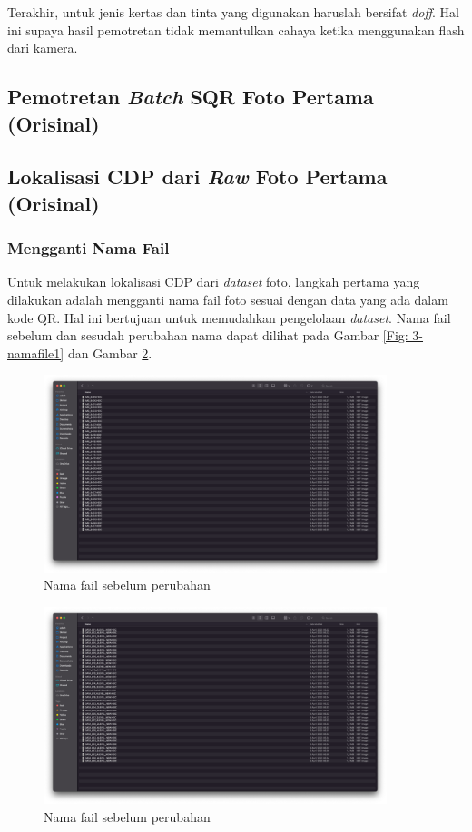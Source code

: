 \noindent Terakhir, untuk jenis kertas dan tinta yang digunakan haruslah bersifat \emph{doff}. Hal ini supaya hasil pemotretan tidak memantulkan cahaya ketika
menggunakan flash dari kamera.

\subsection{Pemotretan \emph{Batch} SQR Foto Pertama (Orisinal)}

\subsection{Lokalisasi CDP dari \emph{Raw} Foto Pertama (Orisinal)}
\subsubsection{Mengganti Nama Fail}
Untuk melakukan lokalisasi CDP dari \emph{dataset} foto, langkah pertama yang dilakukan adalah mengganti nama fail foto sesuai dengan data yang ada dalam kode
QR. Hal ini bertujuan untuk memudahkan pengelolaan \emph{dataset}. Nama fail sebelum dan sesudah perubahan nama dapat dilihat pada Gambar \ref{Fig:
	3-namafile1} dan Gambar \ref{Fig: 3-namafile2}.

\begin{figure}[h]
	\centering
	\includegraphics[width=10cm]{contents/chapter-3/3-namafile1.png}
	\caption{Nama fail sebelum perubahan}
	\label{Fig: 3-namafile1}
\end{figure}

\begin{figure}[h]
	\centering
	\includegraphics[width=10cm]{contents/chapter-3/3-namafile2.png}
	\caption{Nama fail sebelum perubahan}
	\label{Fig: 3-namafile2}
\end{figure}

